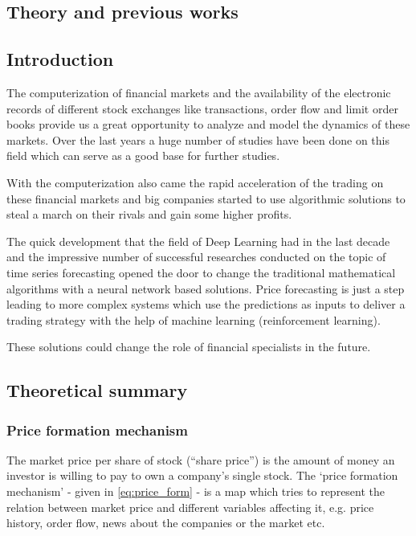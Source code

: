 \documentclass[11pt,a4paper,oneside]{article}
\begin{document}
\begin{center}
  \section{Theory and previous works}
  \label{sec:theory_prev}
\end{center}
\subsection{Introduction}
\label{sec:introduction}

The computerization of financial markets and the availability of the electronic records of different stock exchanges 
like transactions, order flow and limit order books provide us a great opportunity to analyze and model the dynamics of 
these markets. Over the last years a huge number of studies have been done on this field which can serve as a good base 
for further studies.

With the computerization also came the rapid acceleration of the trading on these financial markets and big companies 
started to use algorithmic solutions to steal a march on their rivals and gain some higher profits.

The quick development that the field of Deep Learning had in the last decade and the impressive number of successful 
researches conducted on the topic of time series forecasting opened the door to change the traditional mathematical 
algorithms with a neural network based solutions. Price forecasting is just a step leading to more complex systems 
which use the predictions as inputs to deliver a trading strategy with the help of machine learning 
(reinforcement learning).

These solutions could change the role of financial specialists in the future.

\subsection{Theoretical summary}
\label{sec:theoretical_summary}

  \subsubsection{Price formation mechanism}
  \label{sec:price_formation_mechanism}
  
  The market price per share of stock (“share price”) is the amount of money an investor is willing to pay to own 
  a company's single stock. The ‘price formation mechanism’ - given in \autoref{eq:price_form} - is a map which tries to 
  represent the relation between market price and different variables affecting it, e.g. price history, order flow, 
  news about the companies or the market etc.
\end{document}
